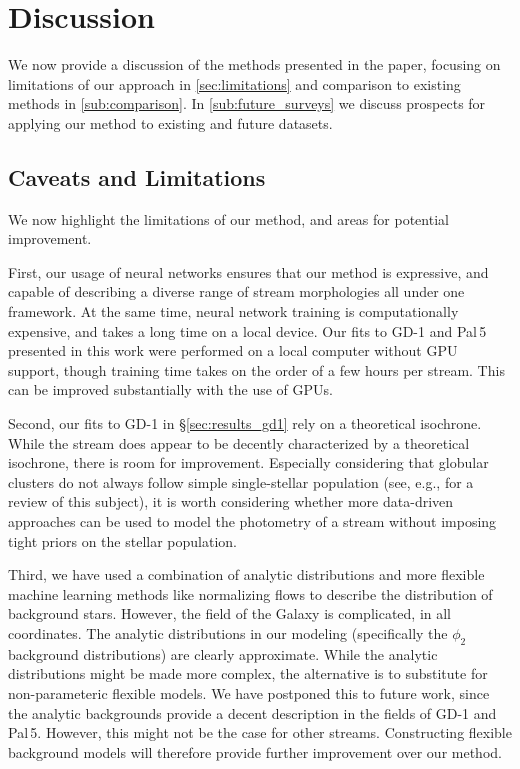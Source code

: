 \documentclass[twocolumn]{aastex631}
\newcommand{\stream}[1]{#1}
\begin{document}



\section{Discussion} \label{sec:discussion}

    We now provide a discussion of the methods presented in the paper, focusing
    on limitations of our approach in \autoref{sec:limitations} and comparison
    to existing methods in \autoref{sub:comparison}. In
    \autoref{sub:future_surveys} we discuss prospects for applying our method to
    existing and future datasets.

    \subsection{Caveats and Limitations}\label{sec:limitations}

        We now highlight the limitations of our method, and areas for potential
        improvement.
    
        First, our usage of neural networks ensures that our method is
        expressive, and capable of describing a diverse range of stream
        morphologies all under one framework. At the same time, neural network
        training is computationally expensive, and takes a long time on a local
        device. Our fits to \stream{GD-1} and \stream{Pal\,5} presented in this
        work were performed on a local computer without GPU support, though
        training time takes on the order of a few hours per stream. This can be
        improved substantially with the use of GPUs.
    
        Second, our fits to \stream{GD-1} in \S\ref{sec:results_gd1} rely on a
        theoretical isochrone. While the stream does appear to be decently
        characterized by a theoretical isochrone, there is room for improvement.
        Especially considering that globular clusters do not always follow
        simple single-stellar population (see, e.g., \citealt{MiloneMarino2022}
        for a review of this subject), it is worth considering whether more
        data-driven approaches can be used to model the photometry of a stream
        without imposing tight priors on the stellar population. 
    
        Third, we have used a combination of analytic distributions and more
        flexible machine learning methods like normalizing flows to describe the
        distribution of background stars. However, the field of the Galaxy is
        complicated, in all coordinates. The analytic distributions in our
        modeling (specifically the $\phi_2$ background distributions) are
        clearly approximate. While the analytic distributions might be made more
        complex, the alternative is to substitute for non-parameteric flexible
        models. We have postponed this to future work, since the analytic
        backgrounds provide a decent description in the fields of \stream{GD-1}
        and \stream{Pal\,5}. However, this might not be the case for other
        streams. Constructing flexible background models will therefore provide
        further improvement over our method.
\end{document}
